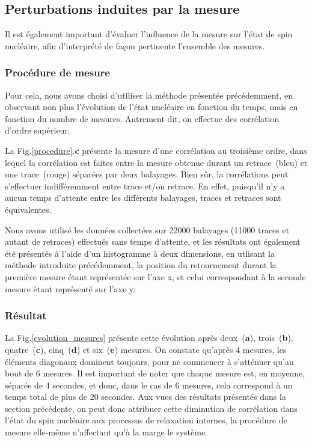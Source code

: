 \subsection{Perturbations induites par la mesure}
Il est également important d'évaluer l'influence de la mesure sur l'état de spin nucléaire, afin d'interprété de façon pertinente l'ensemble des mesures.

\subsubsection{Procédure de mesure}
Pour cela, nous avons choisi d'utiliser la méthode présentée précédemment, en observant non plus l'évolution de l'état nucléaire en fonction du temps, mais en fonction du nombre de mesures. Autrement dit, on effectue des corrélation d'ordre supérieur.

La Fig.\ref{procedure}.\textbf{c} présente la mesure d'une corrélation au troisième ordre, dans lequel la corrélation est faites entre la mesure obtenue durant un retrace~(bleu) et une trace~(rouge) séparées par deux balayages. Bien sûr, la corrélations peut s'effectuer indifféremment entre trace et/ou retrace. En effet, puisqu'il n'y a aucun temps d'attente entre les différents balayages, traces et retraces sont équivalentes.

Nous avons utilisé les données collectées sur 22000 balayages (11000 traces et autant de retraces) effectués sans temps d'attente, et les résultats ont également été présentés à l'aide d'un histogramme à deux dimensions, en utlisant la méthode introduite précédemment, la position du retournement durant la première mesure étant représentée sur l'axe x, et celui correspondant à la seconde mesure étant représenté sur l'axe y.

\subsubsection{Résultat}
La Fig.\ref{evolution_mesures} présente cette évolution après deux~(\textbf{a}), trois~(\textbf{b}), quatre~(\textbf{c}), cinq~(\textbf{d}) et six~(\textbf{e}) mesures. On constate qu'après 4 mesures, les éléments diagonaux dominent toujours, pour ne commencer à s'atténuer qu'au bout de 6 mesures. Il est important de noter que chaque mesure est, en moyenne, séparée de 4 secondes, et donc, dans le cas de 6 mesures, cela correspond à un temps total de plus de 20 secondes. Aux vues des résultats présentés dans la section précédente, on peut donc attribuer cette diminution de corrélation dans l'état du spin nucléaire aux processus de relaxation internes, la procédure de mesure elle-même n'affectant qu'à la marge le système. 

